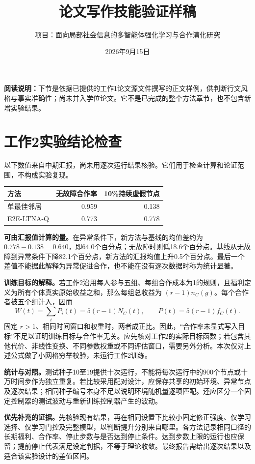 \documentclass[UTF8,fontset=fandol,zihao=-4]{ctexart}
\title{论文写作技能验证样稿}
\author{项目：面向局部社会信息的多智能体强化学习与合作演化研究}
\date{2026年9月15日}
\begin{document}
\maketitle
\noindent\textbf{阅读说明：}下节是依据已提供的工作1论文源文件撰写的正文样例，供判断行文风格与事实准确性；尚未并入学位论文。它不是已完成的整个方法章节，也不包含新增实验结果。

\clearpage
\section{工作2实验结论检查}
以下数值来自中期汇报，尚未用逐次运行结果核验。它们用于检查计算和论证范围，不构成实验复现。

\begin{center}
\begin{tabular}{lrr}
\toprule
方法 & 无故障合作率 & 10\%持续虚假节点\\
\midrule
单最佳邻居 & 0.959 & 0.138\\
E2E-LTNA-Q & 0.773 & 0.778\\
\bottomrule
\end{tabular}
\end{center}

\textbf{可由汇报值计算的量。}在异常条件下，新方法与基线的均值差约为 $0.778-0.138=0.640$，即64.0个百分点；无故障时则低18.6个百分点。基线从无故障到异常条件下降82.1个百分点，新方法的汇报均值上升0.5个百分点。最后一个差值不能据此解释为异常促进合作，也不能在没有逐次数据时称为统计显著。

\textbf{训练目标的解释。}若工作2沿用每人参与五组、每组合作成本为1的规则，且福利定义为所有个体真实原始收益之和，那么每组总收益为 $(r-1)n_C(g)$。每个合作者被五个组计入，因而
\[
 W(t)=\sum_i P_i(t)=5(r-1)N_C(t),\qquad
 \overline P(t)=5(r-1)f_C(t).
\]
固定 $r>1$、相同时间窗口和权重时，两者成正比。因此，“合作率未显式写入目标”不足以证明训练目标与合作率无关。应先核对工作2的实际目标函数；若包含其他代价、非线性变换、不同参数权重或不同评估窗口，需要另外分析。本次仅对上述公式做了小网格穷举校验，未运行工作2训练。

\textbf{统计与对照。}测试种子10至19提供十次运行，不能将每次运行中的900个节点或十万时间步作为独立重复。若比较采用配对设计，应保存共享的初始环境、异常节点及逐次结果；相同种子编号本身不足以说明环境随机量逐项匹配。还应区分一个固定控制器的测试波动与重新训练控制器产生的波动。

\textbf{优先补充的证据。}先核验现有结果，再在相同设置下比较小固定修正强度、仅学习选择、仅学习门控及完整模型，以判断提升分别来自哪里。各方法记录相同口径的长期福利、合作率、停止步数与是否达到停止条件。达到步数上限的运行也应保留；提前停止代表满足设定判据，不等于理论收敛。最终报告需给出逐次结果以及适合该实验设计的差值区间。
\end{document}
